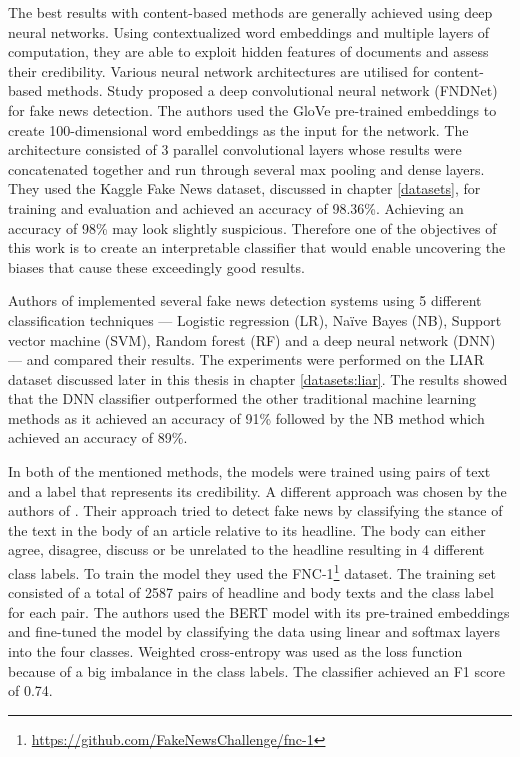 The best results with content-based methods are generally achieved using deep neural networks. Using contextualized word embeddings and multiple layers of computation, they are able to exploit hidden features of documents and assess their credibility. Various neural network architectures are utilised for content-based methods.
Study \cite{prev-work-fndnet} proposed a deep convolutional neural network (FNDNet) for fake news detection. The authors used the GloVe pre-trained embeddings to create 100-dimensional word embeddings as the input for the network. The architecture consisted of 3 parallel convolutional layers whose results were concatenated together and run through several max pooling and dense layers. They used the Kaggle Fake News dataset, discussed in chapter \ref{datasets}, for training and evaluation and achieved an accuracy of 98.36\%. Achieving an accuracy of 98\% may look slightly suspicious. Therefore one of the objectives of this work is to create an interpretable classifier that would enable uncovering the biases that cause these exceedingly good results.

Authors of \cite{prev-work-dltechniques} implemented several fake news detection systems using 5 different classification techniques ---  Logistic regression (LR), Naïve Bayes (NB), Support vector machine (SVM), Random forest (RF) and a deep neural network (DNN) --- and compared their results. The experiments were performed on the LIAR dataset discussed later in this thesis in chapter \ref{datasets:liar}. The results showed that the DNN classifier outperformed the other traditional machine learning methods as it achieved an accuracy of 91\% followed by the NB method which achieved an accuracy of 89\%.

In both of the mentioned methods, the models were trained using pairs of text and a label that represents its credibility. A different approach was chosen by the authors of \cite{bert-exbake}. Their approach tried to detect fake news by classifying the stance of the text in the body of an article relative to its headline. The body can either agree, disagree, discuss or be unrelated to the headline resulting in 4 different class labels. To train the model they used the FNC-1\footnote{\url{https://github.com/FakeNewsChallenge/fnc-1}} dataset.
The training set consisted of a total of 2587 pairs of headline and body texts and the class label for each pair. The authors used the BERT model with its pre-trained embeddings and fine-tuned the model by classifying the data using linear and softmax layers into the four classes. Weighted cross-entropy was used as the loss function because of a big imbalance in the class labels. The classifier achieved an F1 score of 0.74.



